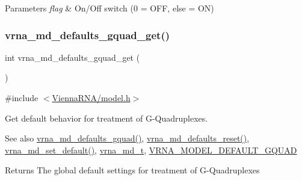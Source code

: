 \begin{DoxyParams}{Parameters}
{\em flag} & On/\+Off switch (0 = O\+FF, else = ON) \\
\hline
\end{DoxyParams}
\mbox{\label{group__model__details_gae645b8612f879eb38b45244fa9eddb9e}} 
\subsubsection{\texorpdfstring{vrna\+\_\+md\+\_\+defaults\+\_\+gquad\+\_\+get()}{vrna\_md\_defaults\_gquad\_get()}}
{\footnotesize\ttfamily int vrna\+\_\+md\+\_\+defaults\+\_\+gquad\+\_\+get (\begin{DoxyParamCaption}\item[{void}]{ }\end{DoxyParamCaption})}



{\ttfamily \#include $<$\mbox{\hyperlink{model_8h}{Vienna\+R\+N\+A/model.\+h}}$>$}



Get default behavior for treatment of G-\/\+Quadruplexes. 

\begin{DoxySeeAlso}{See also}
\mbox{\hyperlink{group__model__details_ga0685ca2aeb39af76f2421fc308163dce}{vrna\+\_\+md\+\_\+defaults\+\_\+gquad()}}, \mbox{\hyperlink{group__model__details_ga70834424cf804d149937de89f80ceb45}{vrna\+\_\+md\+\_\+defaults\+\_\+reset()}}, \mbox{\hyperlink{group__model__details_ga8ac6ff84936282436f822644bf841f66}{vrna\+\_\+md\+\_\+set\+\_\+default()}}, \mbox{\hyperlink{group__model__details_ga1f8a10e12a0a1915f2a4eff0b28ea17c}{vrna\+\_\+md\+\_\+t}}, \mbox{\hyperlink{group__model__details_ga793ed812e86f43799b14b2deee917f23}{V\+R\+N\+A\+\_\+\+M\+O\+D\+E\+L\+\_\+\+D\+E\+F\+A\+U\+L\+T\+\_\+\+G\+Q\+U\+AD}} 
\end{DoxySeeAlso}
\begin{DoxyReturn}{Returns}
The global default settings for treatment of G-\/\+Quadruplexes 
\end{DoxyReturn}
\mbox{\label{group__model__details_ga59b944f61c5d2babec2d4c48c820de67}} 
